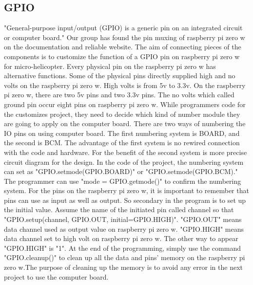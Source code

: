 \documentclass[onecolumn, draftclsnofoot,10pt, compsoc]{IEEEtran}
\begin{document}
\subsection{GPIO}
"General-purpose input/output (GPIO) is a generic pin on an integrated circuit or computer board." Our group has found the pin muxing of raspberry pi zero w on the documentation and reliable website. The aim of connecting pieces of the components is to customize the function of a GPIO pin on raspberry pi zero w for micro-helicopter. Every physical pin on the raspberry pi zero w has alternative functions. Some of the physical pins directly supplied high and no volts on the raspberry pi zero w. High volts is from 5v to 3.3v. On the raspberry pi zero w, there are two 5v pins and two 3.3v pins. The no volts which called ground pin occur eight pins on raspberry pi zero w.
While programmers code for the customizes project, they need to decide which kind of number module they are going to apply on the computer board. There are two ways of numbering the IO pins on using computer board. The first numbering system is BOARD, and the second is BCM. The advantage of the first system is no rewired connection with the code and hardware. For the benefit of the second system is more precise circuit diagram for the design. In the code of the project, the numbering system can set as "GPIO.setmode(GPIO.BOARD)" or "GPIO.setmode(GPIO.BCM)." The programmer can use "mode = GPIO.getmode()" to confirm the numbering system.
For the pins on the raspberry pi zero w, it is important to remember that pins can use as input as well as output. So secondary in the program is to set up the initial value. Assume the name of the initiated pin called channel so that "GPIO.setup(channel, GPIO.OUT, initial=GPIO.HIGH)". "GPIO.OUT" means data channel used as output value on raspberry pi zero w. "GPIO.HIGH" means data channel set to high volt on raspberry pi zero w. The other way to appear "GPIO.HIGH" is "1". At the end of the programming, simply use the command "GPIO.cleanup()" to clean up all the data and pins' memory on the raspberry pi zero w.The purpose of cleaning up the memory is to avoid any error in the next project to use the computer board.
\end{document}
